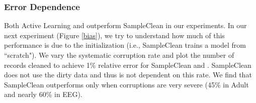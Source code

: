 \subsubsection{Error Dependence}
Both Active Learning and \sys outperform SampleClean in our experiments.
In our next experiment (Figure \ref{bias}), we try to understand how much of this performance 
is due to the initialization (i.e., SampleClean trains a model from ``scratch").
We vary the systematic corruption rate and plot the number of records cleaned to achieve 1\% relative error for SampleClean and \sys.
SampleClean does not use the dirty data and thus is not dependent on this rate.
We find that SampleClean outperforms \sys only when corruptions are very severe (45\% in Adult and nearly 60\% in EEG). 


